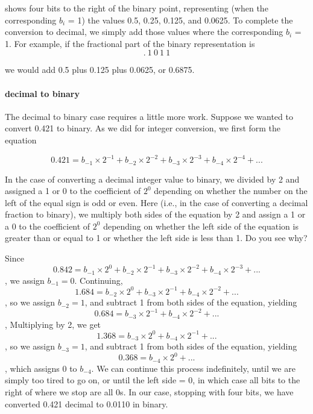 \documentclass{patt}
\begin{document}
shows four bits to the right of the binary point, representing (when 
the corresponding $b_i$ = 1) the values 0.5,  0.25,  0.125, and  0.0625.  
To complete the
conversion to decimal, we simply add those values where the corresponding
$b_i$ = 1.  For example, if the fractional part of the binary representation is  
\begin{equation*}
.\ 1\ 0\ 1\ 1
\end{equation*}

\noindent
we would add 0.5 plus 0.125 plus 0.0625, or 0.6875.

\paragraph{decimal to binary}

The decimal to binary case requires a little more work.
Suppose we wanted to convert 0.421 to binary.  As we did for integer 
conversion, we first form the equation

$$0.421 = b_{-1} \times 2^{-1} + b_{-2} \times 2^{-2} + b_{-3} \times 2^{-3} + b_{-4} \times 2^{-4} + ...$$

\noindent
In the case of converting a decimal integer value to binary, we divided 
by 2 and 
assigned a 1 or 0 to the coefficient of $2^{0}$ depending on whether the number 
on the left of the equal sign is odd or even.  Here (i.e., in the case of 
converting a decimal fraction to binary), we multiply both sides of 
the equation by 2 and assign a 1 or a 0 to the coefficient of $2^{0}$ 
depending on whether the left side of the equation is greater than or 
equal to 1 or whether the left side is less than 1.  Do you see why?

Since 
$$0.842 = b_{-1} \times 2^{0} + b_{-2} \times 2^{-1} + b_{-3} \times 2^{-2} + b_{-4} \times 2^{-3} + ...$$,
\noindent
we assign $b_{-1} = 0$.  Continuing, 
$$1.684 = b_{-2} \times 2^{0} + b_{-3} \times 2^{-1} + b_{-4} \times 2^{-2} + ...$$,
\noindent
so we assign $b_{-2} = 1$, and subtract 1 from both sides of the equation,
yielding
$$0.684 = b_{-3} \times 2^{-1} + b_{-4} \times 2^{-2} + ...$$,
\noindent
Multiplying by 2, we get
$$1.368 = b_{-3} \times 2^{0} + b_{-4} \times 2^{-1} + ...$$,
\noindent
so we assign $b_{-3} = 1$, and subtract 1 from both sides of the equation,
yielding
$$0.368 = b_{-4} \times 2^{0} + ...$$, which assigns 0 to $b_{-4}$.
\noindent
We can continue this process indefinitely, until we are simply too tired to
go on, or until the left side = 0, in which case all bits to the right of where
we stop are all 0s.  In our case, stopping with four bits, we have 
converted 0.421 decimal to 0.0110 in binary.
\end{document}
